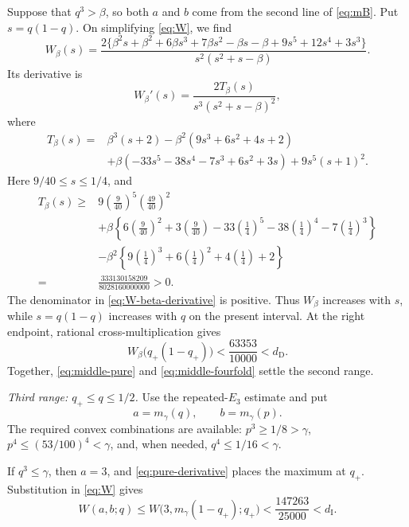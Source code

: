 \documentclass[11pt,a4paper]{amsart}
\begin{document}
Suppose that \(q^3>\beta\), so both \(a\) and \(b\) come from the second
line of \eqref{eq:mB}.  Put \(s=q(1-q)\).  On simplifying
\eqref{eq:W}, we find
\begin{equation}\label{eq:W-beta}
 W_\beta(s)=
 \frac{2\{\beta^2s+\beta^2+6\beta s^3+7\beta s^2-\beta s-\beta
       +9s^5+12s^4+3s^3\}}
 {s^2(s^2+s-\beta)}.
\end{equation}
Its derivative is
\begin{equation}\label{eq:W-beta-derivative}
 W_\beta'(s)=
 \frac{2T_\beta(s)}{s^3(s^2+s-\beta)^2},
\end{equation}
where
\[
\begin{split}
 T_\beta(s)={}&\beta^3(s+2)
 -\beta^2(9s^3+6s^2+4s+2)\\
 &+\beta(-33s^5-38s^4-7s^3+6s^2+3s)
 +9s^5(s+1)^2.
\end{split}
\]
Here \(9/40\leqslant s\leqslant1/4\), and
\[
\begin{split}
T_\beta(s)\geqslant{}&
9\left(\frac9{40}\right)^5\left(\frac{49}{40}\right)^2\\
&+\beta\left\{
6\left(\frac9{40}\right)^2+3\left(\frac9{40}\right)
-33\left(\frac14\right)^5-38\left(\frac14\right)^4
-7\left(\frac14\right)^3\right\}\\
&-\beta^2\left\{
9\left(\frac14\right)^3+6\left(\frac14\right)^2
+4\left(\frac14\right)+2\right\}\\
={}&\frac{333130158209}{8028160000000}>0.
\end{split}
\]
The denominator in \eqref{eq:W-beta-derivative} is positive.  Thus
\(W_\beta\) increases with \(s\), while \(s=q(1-q)\) increases with \(q\)
on the present interval.  At the right endpoint, rational
cross-multiplication gives
\begin{equation}\label{eq:middle-fourfold}
        W_\beta\bigl(q_+(1-q_+)\bigr)
        <\frac{63353}{10000}<d_{\mathrm D}.
\end{equation}
Together, \eqref{eq:middle-pure} and \eqref{eq:middle-fourfold} settle the
second range.

\medskip
\noindent\emph{Third range: \(q_+\leqslant q\leqslant1/2\).}
Use the repeated-\(E_3\) estimate and put
\[
        a=m_\gamma(q),\qquad b=m_\gamma(p).
\]
The required convex combinations are available:
\(p^3\geqslant1/8>\gamma\),
\(p^4\leqslant(53/100)^4<\gamma\), and, when needed,
\(q^4\leqslant1/16<\gamma\).

If \(q^3\leqslant\gamma\), then \(a=3\), and
\eqref{eq:pure-derivative} places the maximum at \(q_+\).  Substitution in
\eqref{eq:W} gives
\begin{equation}\label{eq:high-pure}
 W(a,b;q)
 \leqslant W\bigl(3,m_\gamma(1-q_+);q_+\bigr)
 <\frac{147263}{25000}<d_{\mathrm I}.
\end{equation}
\end{document}
